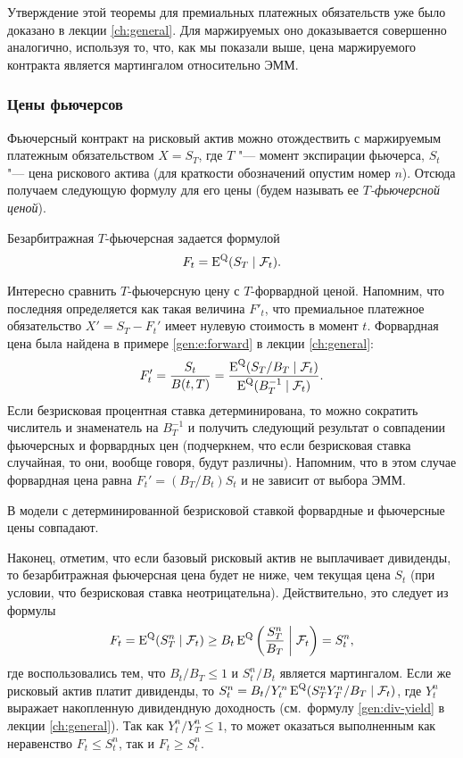 Утверждение этой теоремы для премиальных платежных обязательств уже было доказано в лекции \ref{ch:general}.
Для маржируемых оно доказывается совершенно аналогично, используя то, что, как мы показали выше, цена маржируемого контракта является мартингалом относительно ЭММ.


\subsubsection{Цены фьючерсов}
Фьючерсный контракт на рисковый актив можно отождествить с маржируемым платежным обязательством $X=S_T$, где $T$ "--- момент экспирации фьючерса, $S_t$ "--- цена рискового актива (для краткости обозначений опустим номер $n$). 
Отсюда получаем следующую формулу для его цены (будем называть ее \emph{$T$-фьючерсной ценой}).

\begin{proposition}
Безарбитражная $T$-фьючерсная задается формулой
\begin{equation}
\label{fut:futures-price}
F_t = \operatorname{E}^{\mathrm{Q}}(S_T \mid \mathcal{F}_t).
\end{equation}
\end{proposition}

Интересно сравнить $T$-фьючерсную цену с $T$-форвардной ценой.
Напомним, что последняя определяется как такая величина $F'_t$, что премиальное платежное обязательство $X' = S_T - F_t'$ имеет нулевую стоимость в момент $t$.
Форвардная цена была найдена в примере \ref{gen:e:forward} в лекции \ref{ch:general}: 
\[
F_t' = \frac{S_t}{B(t,T)} = \frac{\operatorname{E}^{\mathrm{Q}}(S_T/B_T\mid \mathcal{F}_t)}{\operatorname{E}^{\mathrm{Q}}(B_T^{-1} \mid \mathcal{F}_t)}. 
\]
Если безрисковая процентная ставка детерминирована, то можно сократить числитель и знаменатель на $B_T^{-1}$ и получить следующий результат о совпадении фьючерсных и форвардных цен (подчеркнем, что если безрисковая ставка случайная, то они, вообще говоря, будут различны).
Напомним, что в этом случае форвардная цена равна $F_t' = (B_T/B_t)S_t$ и не зависит от выбора ЭММ.

\begin{proposition}
\label{fut:p:equal-prices}
В модели с детерминированной безрисковой ставкой форвардные и фьючерсные цены совпадают.
\end{proposition}

Наконец, отметим, что если базовый рисковый актив не выплачивает дивиденды, то безарбитражная фьючерсная цена будет не ниже, чем текущая цена $S_t$ (при условии, что безрисковая ставка неотрицательна). 
Действительно, это следует из формулы
\[
F_t = \operatorname{E}^{\mathrm{Q}}(S_T^n\mid \mathcal{F}_t) \ge B_t\operatorname{E}^{\mathrm{Q}}\left(\frac{S_T^n}{B_T}\;\bigg|\; \mathcal{F}_t\right) = S_t^n,
\]
где воспользовались тем, что $B_t/B_T \le 1$ и $S_t^n/B_t$ является мартингалом.
Если же рисковый актив платит дивиденды, то $S_t^n = B_t/Y_t^n \operatorname{E}^{\mathrm{Q}}(S_T^nY_T^n/B_T \mid \mathcal{F}_t)$, где $Y_t^n$ выражает накопленную дивидендную доходность (см.~формулу \eqref{gen:div-yield} в лекции \ref{ch:general}).
Так как $Y_t^n/Y_T^n \le 1$, то может оказаться выполненным как неравенство $F_t\le S_t^n$, так и $F_t\ge S_t^n$.

